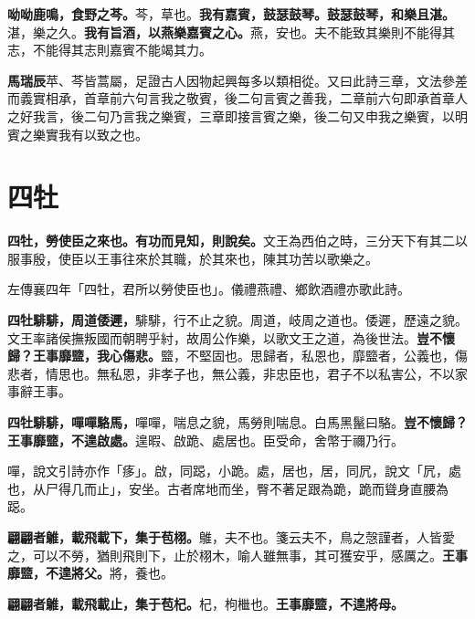 \textbf{呦呦鹿鳴，食野之芩。}{\footnotesize 芩，草也。}\textbf{我有嘉賓，鼓瑟鼓琴。鼓瑟鼓琴，和樂且湛。}{\footnotesize 湛，樂之久。}\textbf{我有旨酒，以燕樂嘉賓之心。}{\footnotesize 燕，安也。夫不能致其樂則不能得其志，不能得其志則嘉賓不能竭其力。}

\begin{quoting}\textbf{馬瑞辰}苹、芩皆蒿屬，足證古人因物起興每多以類相從。又曰此詩三章，文法參差而義實相承，首章前六句言我之敬賓，後二句言賓之善我，二章前六句即承首章人之好我言，後二句乃言我之樂賓，三章即接言賓之樂，後二句又申我之樂賓，以明賓之樂實我有以致之也。\end{quoting}

\section{四牡}


\textbf{四牡，勞使臣之來也。有功而見知，則說矣。}{\footnotesize 文王為西伯之時，三分天下有其二以服事殷，使臣以王事往來於其職，於其來也，陳其功苦以歌樂之。}

\begin{quoting}左傳襄四年「四牡，君所以勞使臣也」。儀禮燕禮、鄉飲酒禮亦歌此詩。\end{quoting}

\textbf{四牡騑騑，周道倭遲，}{\footnotesize 騑騑，行不止之貌。周道，岐周之道也。倭遲，歷遠之貌。文王率諸侯撫叛國而朝聘乎紂，故周公作樂，以歌文王之道，為後世法。}\textbf{豈不懷歸？王事靡盬，我心傷悲。}{\footnotesize 盬，不堅固也。思歸者，私恩也，靡盬者，公義也，傷悲者，情思也。無私恩，非孝子也，無公義，非忠臣也，君子不以私害公，不以家事辭王事。}

\textbf{四牡騑騑，嘽嘽駱馬，}{\footnotesize 嘽嘽，喘息之貌，馬勞則喘息。白馬黑鬣曰駱。}\textbf{豈不懷歸？王事靡盬，不遑啟處。}{\footnotesize 遑暇、啟跪、處居也。臣受命，舍幣于禰乃行。}

\begin{quoting}嘽，說文引詩亦作「痑」。啟，同跽，小跪。處，居也，居，同凥，說文「凥，處也，从尸得几而止」，安坐。古者席地而坐，臀不著足跟為跪，跪而聳身直腰為跽。\end{quoting}

\textbf{翩翩者鵻，載飛載下，集于苞栩。}{\footnotesize 鵻，夫不也。箋云夫不，鳥之愨謹者，人皆愛之，可以不勞，猶則飛則下，止於栩木，喻人雖無事，其可獲安乎，感厲之。}\textbf{王事靡盬，不遑將父。}{\footnotesize 將，養也。}

\textbf{翩翩者鵻，載飛載止，集于苞杞。}{\footnotesize 杞，枸檵也。}\textbf{王事靡盬，不遑將母。}

